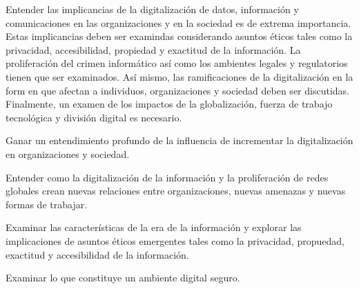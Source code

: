 \begin{syllabus}


\begin{justification}
Entender las implicancias de la digitalización de datos, información y comunicaciones en las organizaciones y en la sociedad es de extrema importancia. Estas implicancias deben ser examindas considerando asuntos éticos tales como la privacidad, accesibilidad, propiedad y exactitud de la información. La proliferación del crimen informático así como los ambientes legales y regulatorios tienen que ser examinados. Así mismo, las ramificaciones de la digitalización en la form en que afectan a individuos, organizaciones y sociedad deben ser discutidas. Finalmente, un examen de los impactos de la globalización, fuerza de trabajo tecnológica y división digital es necesario.
\end{justification}

\begin{goals}
\item Ganar un entendimiento profundo de la influencia de incrementar la digitalización en organizaciones y sociedad.
\item Entender como la digitalización de la información y la proliferación de redes globales crean nuevas relaciones entre organizaciones, nuevas amenazas y nuevas formas de trabajar.
\item Examinar las características de la era de la información y explorar las implicaciones de asuntos éticos emergentes tales como la privacidad, propuedad, exactitud y accesibilidad de la información.
\item Examinar lo que constituye un ambiente digital seguro.
\end{goals}

\begin{outcomes}
\end{outcomes}


\end{syllabus}
